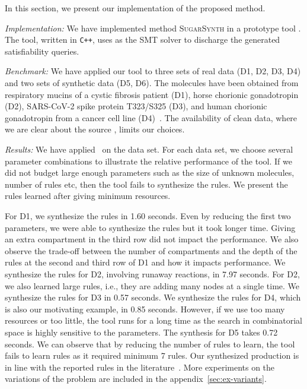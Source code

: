 In this section, we present our implementation of the proposed method.

{\em Implementation:} 
We have implemented method \textsc{SugarSynth} in a prototype tool {\ourtool}.
%
The tool, written in {\tt C++}, uses {\zthree}\cite{z3} as the SMT solver
to discharge the generated satisfiability queries.
%


{\em Benchmark: }
We have applied our tool to three sets of real data (D1, D2, D3, D4) and two sets of synthetic data (D5, D6). The molecules have been obtained from
respiratory mucins of a cystic fibrosis patient (D1),
horse chorionic gonadotropin (D2), SARS-CoV-2 spike protein T323/S325 (D3), and human chorionic gonadotropin from a cancer cell line (D4)~\cite{Jaiman2018,10.1093/glycob/cwaa042}.
The availability of clean data, where we are clear about the source
, limits our choices.

% 



{\em Results:}
We have applied \ourtool~on the data set. For each data set, we choose several
parameter combinations to illustrate the relative performance of the tool.
If we did not budget large enough parameters such as the size of unknown molecules, number of rules etc, then the tool fails to
synthesize the rules.
We present the rules learned after giving minimum resources.

For D1, we synthesize the rules in 1.60 seconds. Even by reducing the first two parameters, we were able to synthesize the rules but it took longer time.
Giving an extra compartment in the third row did not impact the performance.  We also observe the trade-off between the number of compartments
and the depth of the rules at the second and third row of D1 and how it impacts performance.
We synthesize the rules for D2, involving runaway reactions,  in 7.97 seconds.
For D2, we also learned large rules, i.e., they are adding many nodes at a single time.
We synthesize the rules for D3 in 0.57 seconds. We synthesize the rules for D4, which is also our motivating example, in 0.85 seconds.
However, if we use too many resources or too little, the tool runs for a long time as the search in combinatorial space is highly sensitive to the parameters.
The synthesis for D5 takes 0.72 seconds. We can observe that by reducing the number of rules to learn, the tool fails to learn rules as it required minimum 7 rules.
Our synthesized production is in line with the reported rules
in the literature~\cite{Jaiman2018}.
More experiments on the variations of the problem
are included in the appendix~\ref{sec:ex-variants}. %

